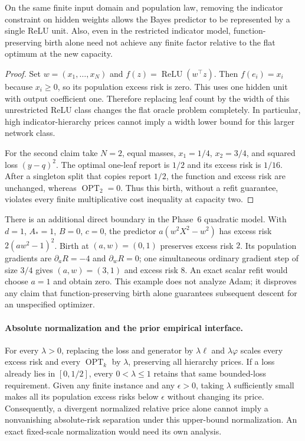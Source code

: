 \begin{proposition}
\label{prop:p9-nontransfer}
On the same finite input domain and population law, removing the indicator
constraint on hidden weights allows the Bayes predictor to be represented
by a single ReLU unit. Also, even in the restricted indicator model,
function-preserving birth alone need not achieve any finite factor relative
to the flat optimum at the new capacity.
\end{proposition}
\begin{proof}
Set $w=(x_1,\ldots,x_N)$ and $f(z)=\operatorname{ReLU}(w^\top z)$.
Then $f(e_i)=x_i$ because $x_i\ge0$, so its population excess risk is zero.
This uses one hidden unit with output coefficient one. Therefore replacing
leaf count by the width of this unrestricted ReLU class changes the flat
oracle problem completely. In particular, high indicator-hierarchy prices
cannot imply a width lower bound for this larger network class.

For the second claim take $N=2$, equal masses, $x_1=1/4$, $x_2=3/4$, and
squared loss $(y-q)^2$. The optimal one-leaf report is $1/2$ and its excess
risk is $1/16$. After a singleton split that copies report $1/2$, the
function and excess risk are unchanged, whereas $\operatorname{OPT}_2=0$.
Thus this birth, without a refit guarantee, violates every finite
multiplicative cost inequality at capacity two.
\end{proof}

There is an additional direct boundary in the Phase~6 quadratic model.
With $d=1$, $A_*=1$, $B=0$, $c=0$, the predictor
$a(w^2X^2-w^2)$ has excess risk $2(aw^2-1)^2$.
Birth at $(a,w)=(0,1)$ preserves excess risk $2$. Its population gradients
are $\partial_aR=-4$ and $\partial_wR=0$; one simultaneous ordinary
gradient step of size $3/4$ gives $(a,w)=(3,1)$ and excess risk $8$.
An exact scalar refit would choose $a=1$ and obtain zero. This example
does not analyze Adam; it disproves any claim that function-preserving
birth alone guarantees subsequent descent for an unspecified optimizer.

\paragraph{Absolute normalization and the prior empirical interface.}
For every $\lambda>0$, replacing the loss and generator by
$\lambda\ell$ and $\lambda\varphi$ scales every excess risk and every
$\operatorname{OPT}_k$ by $\lambda$, preserving all hierarchy prices.
If a loss already lies in $[0,1/2]$, every $0<\lambda\le1$ retains that
same bounded-loss requirement. Given any finite instance and any
$\epsilon>0$, taking $\lambda$ sufficiently small makes all its
population excess risks below $\epsilon$ without changing its price.
Consequently, a divergent normalized relative price alone cannot imply
a nonvanishing absolute-risk separation under this upper-bound
normalization. An exact fixed-scale normalization would need its own
analysis.

